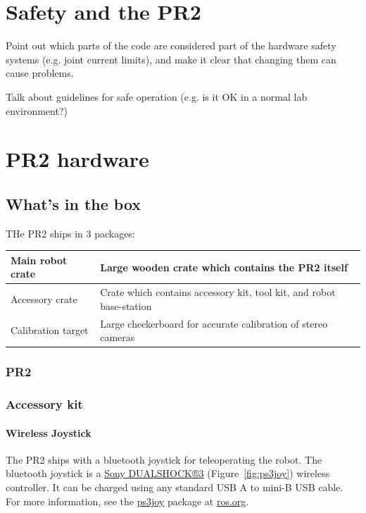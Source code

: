 \chapter{Safety and the PR2}
Point out which parts of the code are considered part of the hardware safety systems (e.g. joint current limits), 
and make it clear that changing them can cause problems.

Talk about guidelines for safe operation (e.g. is it OK in a normal lab environment?)

\chapter{PR2 hardware}

\section{What's in the box}
THe PR2 ships in 3 packages:

\begin{tabular}{| l | l |}
\hline      
  Main robot crate & Large wooden crate which contains the PR2 itself \\ \hline
  Accessory crate & Crate which contains accessory kit, tool kit, and robot base-station \\ \hline
  Calibration target & Large checkerboard for accurate calibration of stereo cameras \\ \hline
\end{tabular}

\subsection{PR2}
\subsection{Accessory kit}
\subsubsection{Wireless Joystick}
The PR2 ships with a bluetooth joystick for teleoperating the robot. The bluetooth joystick is a 
\href{http://www.sonystyle.com/webapp/wcs/stores/servlet/ProductDisplay?catalogId=10551&storeId=10151&langId=-1&productId=8198552921665411965#additionalImage1%22}{Sony DUALSHOCK®3} (Figure~\ref{fig:ps3joy}) 
wireless controller. It can be charged using any standard USB A to mini-B USB cable. For more information, see the 
\href{http://www.ros.org/wiki/ps3joy}{ps3joy} package at \href{http://www.ros.org}{ros.org}.

